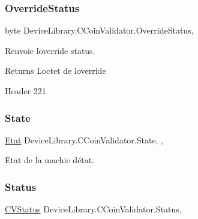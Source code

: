 \subsubsection{\texorpdfstring{Override\+Status}{OverrideStatus}}
{\footnotesize\ttfamily byte Device\+Library.\+C\+Coin\+Validator.\+Override\+Status\hspace{0.3cm}{\ttfamily [get]}, {\ttfamily [protected]}}



Renvoie l\textquotesingle{}override status. 

\begin{DoxyReturn}{Returns}
L\textquotesingle{}octet de l\textquotesingle{}override
\end{DoxyReturn}


Header 221\mbox{\label{class_device_library_1_1_c_coin_validator_a38527f741c0cee761a37bff50bafbd20}} 
\subsubsection{\texorpdfstring{State}{State}}
{\footnotesize\ttfamily \mbox{\hyperlink{class_device_library_1_1_c_coin_validator_a33c79ff59c961c2e1bbf95838e5d6871}{Etat}} Device\+Library.\+C\+Coin\+Validator.\+State\hspace{0.3cm}{\ttfamily [get]}, {\ttfamily [set]}, {\ttfamily [protected]}}



Etat de la machie d\textquotesingle{}état. 

\mbox{\label{class_device_library_1_1_c_coin_validator_ac45ed64d9685ac636e48b00510c7654e}} 
\subsubsection{\texorpdfstring{Status}{Status}}
{\footnotesize\ttfamily \mbox{\hyperlink{class_device_library_1_1_c_coin_validator_a62ce7ca9d0cc8ef92edb58f06a34add1}{C\+V\+Status}} Device\+Library.\+C\+Coin\+Validator.\+Status\hspace{0.3cm}{\ttfamily [get]}, {\ttfamily [protected]}}




